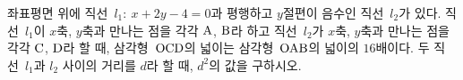 좌표평면 위에 직선~$l_1:\ x+2y-4=0$과 평행하고 $y$절편이 음수인 직선~$l_2$가 있다. 직선~$l_1$이 $x$축, $y$축과 만나는 점을 각각 $\mathrm{A}$, $\mathrm{B}$라 하고 직선~$l_2$가 $x$축, $y$축과 만나는 점을 각각 $\mathrm{C}$, $\mathrm{D}$라 할 때, 삼각형~$\mathrm{OCD}$의 넓이는 삼각형~$\mathrm{OAB}$의 넓이의 $16$배이다. 두 직선~$l_1$과 $l_2$ 사이의 거리를 $d$라 할 때, $d^2$의 값을 구하시오. 
